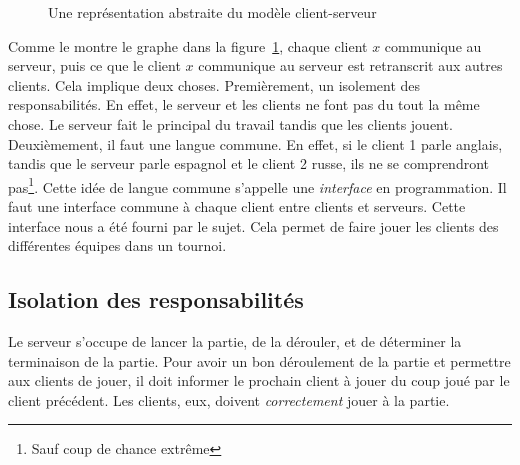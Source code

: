 \begin{figure}[H]
	\centering
	\caption{Une représentation abstraite du modèle client-serveur}
	\label{fig:repr-serveur}
\end{figure}

Comme le montre le graphe dans la figure~\ref{fig:repr-serveur}, 
chaque client $x$ communique au serveur, puis ce que le client $x$ communique au serveur est retranscrit  aux autres clients.
Cela implique deux choses. Premièrement, un isolement des responsabilités. En effet, le serveur
et les clients ne font pas du tout la même chose. Le serveur fait le principal du travail tandis que les clients jouent.
Deuxièmement, il faut une langue commune. En effet, si le client 1 parle anglais, tandis que le serveur parle espagnol et le client 2 russe,
ils ne se comprendront pas\footnote{Sauf coup de chance extrême}. Cette idée de langue
commune s'appelle une \emph{interface} en programmation. Il faut une interface
commune à chaque client entre clients et serveurs. Cette interface nous a été fourni par le sujet. Cela permet
de faire jouer les clients des différentes équipes dans un tournoi.

\subsection{Isolation des responsabilités}

Le serveur s'occupe de lancer la partie, de la dérouler, et de déterminer la terminaison de la partie.
Pour avoir un bon déroulement de la partie et permettre aux clients de jouer,
il doit informer le prochain client à jouer du coup joué par le client précédent.
Les clients, eux, doivent \emph{correctement} jouer à la partie.

